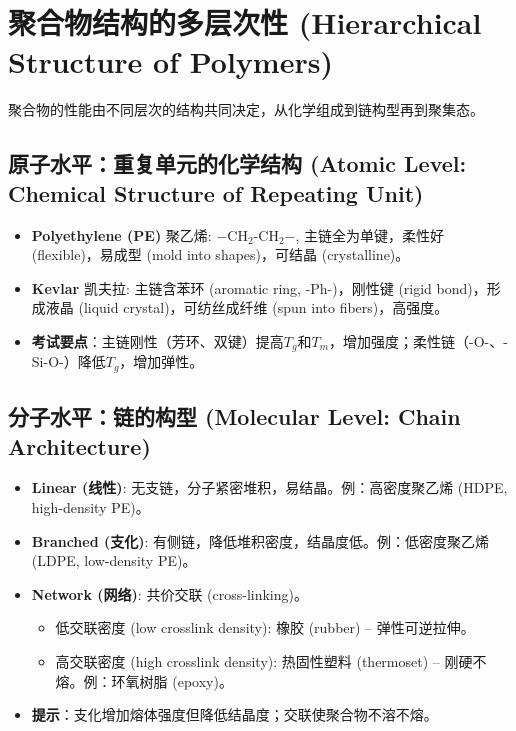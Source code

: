\documentclass[12pt,a4paper]{ctexart}
\begin{document}
\newpage
\section{聚合物结构的多层次性 (Hierarchical Structure of Polymers)}

聚合物的性能由不同层次的结构共同决定，从化学组成到链构型再到聚集态。

\subsection{原子水平：重复单元的化学结构 (Atomic Level: Chemical Structure of Repeating Unit)}
\begin{itemize}
    \item \textbf{Polyethylene (PE)} 聚乙烯: $-$CH$_2$-CH$_2$$-$, 主链全为单键，柔性好 (flexible)，易成型 (mold into shapes)，可结晶 (crystalline)。
    \item \textbf{Kevlar} 凯夫拉: 主链含苯环 (aromatic ring, -Ph-)，刚性键 (rigid bond)，形成液晶 (liquid crystal)，可纺丝成纤维 (spun into fibers)，高强度。
    \item \textbf{考试要点}：主链刚性（芳环、双键）提高$T_g$和$T_m$，增加强度；柔性链（-O-、-Si-O-）降低$T_g$，增加弹性。
\end{itemize}

\subsection{分子水平：链的构型 (Molecular Level: Chain Architecture)}
\begin{itemize}
    \item \textbf{Linear (线性)}: 无支链，分子紧密堆积，易结晶。例：高密度聚乙烯 (HDPE, high-density PE)。
    \item \textbf{Branched (支化)}: 有侧链，降低堆积密度，结晶度低。例：低密度聚乙烯 (LDPE, low-density PE)。
    \item \textbf{Network (网络)}: 共价交联 (cross-linking)。
    \begin{itemize}
        \item 低交联密度 (low crosslink density): 橡胶 (rubber) – 弹性可逆拉伸。
        \item 高交联密度 (high crosslink density): 热固性塑料 (thermoset) – 刚硬不熔。例：环氧树脂 (epoxy)。
    \end{itemize}
    \item \textbf{提示}：支化增加熔体强度但降低结晶度；交联使聚合物不溶不熔。
\end{itemize}
\end{document}
